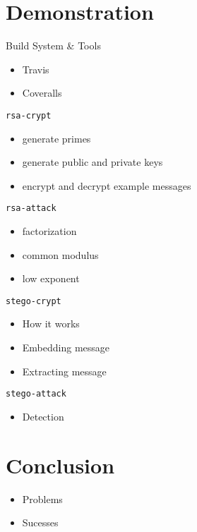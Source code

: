 \documentclass[presentation]{beamer}
\begin{document}
\section{Demonstration}
\label{sec:orgheadline1}
\begin{frame}[label=sec-3-1]{Build System \& Tools}
\begin{itemize}
\item Travis
\item Coveralls
\end{itemize}
\end{frame}
\begin{frame}[fragile,label=sec-3-2]{\texttt{rsa-crypt}}
 \begin{itemize}
\item generate primes
\item generate public and private keys
\item encrypt and decrypt example messages
\end{itemize}
\end{frame}
\begin{frame}[fragile,label=sec-3-3]{\texttt{rsa-attack}}
 \begin{itemize}
\item factorization
\item common modulus
\item low exponent
\end{itemize}
\end{frame}
\begin{frame}[fragile,label=sec-3-4]{\texttt{stego-crypt}}
 \begin{itemize}
\item How it works
\item Embedding message
\item Extracting message
\end{itemize}
\end{frame}
\begin{frame}[fragile,label=sec-3-5]{\texttt{stego-attack}}
 \begin{itemize}
\item Detection
\end{itemize}
\end{frame}
\section{Conclusion}
\label{sec:orgheadline1}
\begin{itemize}
\item Problems
\item Sucesses
\end{itemize}
\end{document}
